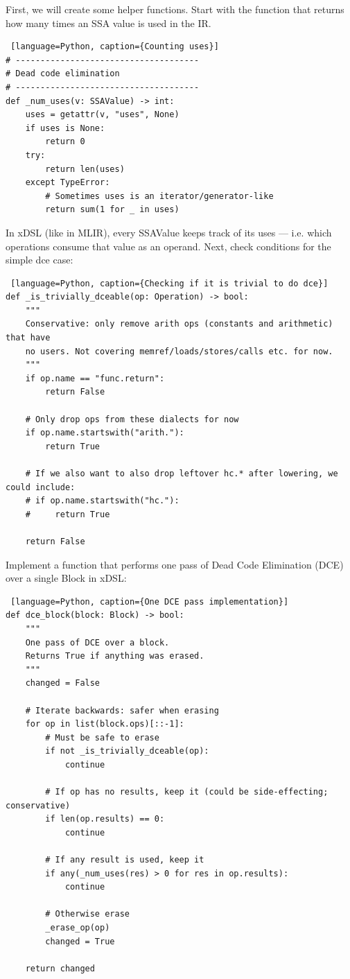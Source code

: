 \documentclass[../main.tex]{subfiles}
\begin{document}
First, we will create some helper functions. Start with the function that returns how many times an SSA value is used in the IR.
\begin{lstlisting} [language=Python, caption={Counting uses}]
# -------------------------------------
# Dead code elimination
# -------------------------------------
def _num_uses(v: SSAValue) -> int:
    uses = getattr(v, "uses", None)
    if uses is None:
        return 0
    try:
        return len(uses)
    except TypeError:
        # Sometimes uses is an iterator/generator-like
        return sum(1 for _ in uses)
\end{lstlisting}
In xDSL (like in MLIR), every SSAValue keeps track of its uses — i.e. which operations consume that value as an operand.
Next, check conditions for the simple dce case:
\begin{lstlisting} [language=Python, caption={Checking if it is trivial to do dce}]
def _is_trivially_dceable(op: Operation) -> bool:
    """
    Conservative: only remove arith ops (constants and arithmetic) that have
    no users. Not covering memref/loads/stores/calls etc. for now.
    """
    if op.name == "func.return":
        return False

    # Only drop ops from these dialects for now
    if op.name.startswith("arith."):
        return True

    # If we also want to also drop leftover hc.* after lowering, we could include:
    # if op.name.startswith("hc."):
    #     return True

    return False
\end{lstlisting}
Implement a function that performs one pass of Dead Code Elimination (DCE) over a single Block in xDSL:
\begin{lstlisting} [language=Python, caption={One DCE pass implementation}]
def dce_block(block: Block) -> bool:
    """
    One pass of DCE over a block.
    Returns True if anything was erased.
    """
    changed = False

    # Iterate backwards: safer when erasing
    for op in list(block.ops)[::-1]:
        # Must be safe to erase
        if not _is_trivially_dceable(op):
            continue

        # If op has no results, keep it (could be side-effecting; conservative)
        if len(op.results) == 0:
            continue

        # If any result is used, keep it
        if any(_num_uses(res) > 0 for res in op.results):
            continue

        # Otherwise erase
        _erase_op(op)
        changed = True

    return changed
\end{lstlisting}
\end{document}
